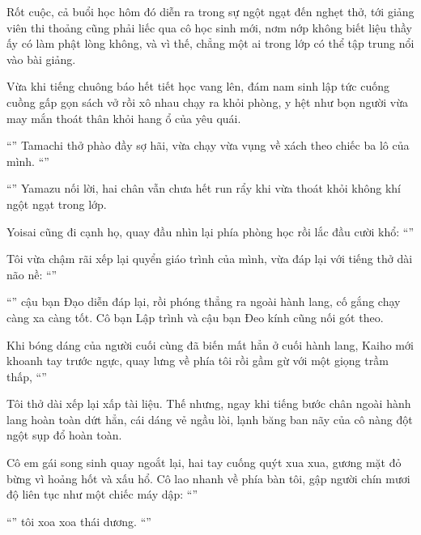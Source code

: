 \documentclass[../main.tex]{subfiles}
\begin{document}
Rốt cuộc, cả buổi học hôm đó diễn ra trong sự ngột ngạt đến nghẹt thở, tới giảng viên thi thoảng cũng phải liếc qua cô học sinh mới, nơm nớp không biết liệu thầy ấy có làm phật lòng không, và vì thế, chẳng một ai trong lớp có thể tập trung nổi vào bài giảng.

Vừa khi tiếng chuông báo hết tiết học vang lên, đám nam sinh lập tức cuống cuồng gấp gọn sách vở rồi xô nhau chạy ra khỏi phòng, y hệt như bọn người vừa may mắn thoát thân khỏi hang ổ của yêu quái.

``'' Tamachi thở phào đầy sợ hãi, vừa chạy vừa vụng về xách theo chiếc ba lô của mình. ``''

``'' Yamazu nối lời, hai chân vẫn chưa hết run rẩy khi vừa thoát khỏi không khí ngột ngạt trong lớp.

Yoisai cũng đi cạnh họ, quay đầu nhìn lại phía phòng học rồi lắc đầu cười khổ: ``''

Tôi vừa chậm rãi xếp lại quyển giáo trình của mình, vừa đáp lại với tiếng thở dài não nề: ``''

``'' cậu bạn Đạo diễn đáp lại, rồi phóng thẳng ra ngoài hành lang, cố gắng chạy càng xa càng tốt. Cô bạn Lập trình và cậu bạn Đeo kính cũng nối gót theo.

Khi bóng dáng của người cuối cùng đã biến mất hẳn ở cuối hành lang, Kaiho mới khoanh tay trước ngực, quay lưng về phía tôi rồi gầm gừ với một giọng trầm thấp, ``''

Tôi thở dài xếp lại xấp tài liệu. Thế nhưng, ngay khi tiếng bước chân ngoài hành lang hoàn toàn dứt hẳn, cái dáng vẻ ngầu lòi, lạnh băng ban nãy của cô nàng đột ngột sụp đổ hoàn toàn.

Cô em gái song sinh quay ngoắt lại, hai tay cuống quýt xua xua, gương mặt đỏ bừng vì hoảng hốt và xấu hổ. Cô lao nhanh về phía bàn tôi, gập người chín mươi độ liên tục như một chiếc máy dập: ``''

``'' tôi xoa xoa thái dương. ``''
\end{document}
